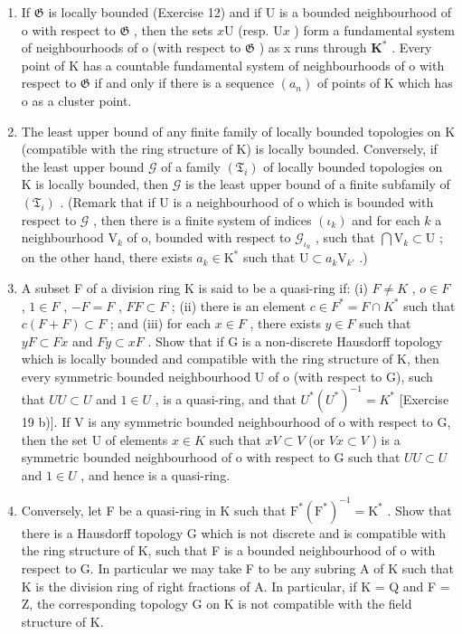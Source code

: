 \begin{enumerate}
\def\labelenumi{\alph{enumi})}
\setcounter{enumi}{1}
\item
  If \(\mathfrak{G}\) is locally bounded (Exercise 12) and if U is a bounded neighbourhood of o with respect to \(\mathfrak{G}\) , then the sets \(x\mathrm{U}\) (resp. \(\mathrm{U}x\) ) form a fundamental system of neighbourhoods of o (with respect to \(\mathfrak{G}\) ) as x runs through \(\mathbf{K}^*\) . Every point of K has a countable fundamental system of neighbourhoods of o with respect to \(\mathfrak{G}\) if and only if there is a sequence \((a_n)\) of points of K which has o as a cluster point.
\item
  The least upper bound of any finite family of locally bounded topologies on K (compatible with the ring structure of K) is locally bounded. Conversely, if the least upper bound \(\mathcal{G}\) of a family \((\mathfrak{T}_i)\) of locally bounded topologies on K is locally bounded, then \(\mathcal{G}\) is the least upper bound of a finite subfamily of \((\mathfrak{T}_i)\) . (Remark that if U is a neighbourhood of o which is bounded with respect to \(\mathcal{G}\) , then there is a finite system of indices \((\iota_k)\) and for each \(k\) a neighbourhood \(\mathrm{V}_k\) of o, bounded with respect to \(\mathcal{G}_{\iota_k}\) , such that \(\bigcap \mathrm{V}_k \subset \mathrm{U}\) ; on the other hand, there exists \(a_k \in \mathrm{K}^*\) such that \(\mathrm{U} \subset a_k \mathrm{V}_{k'}\) .)
\item
  A subset F of a division ring K is said to be a quasi-ring if: (i) \(F \neq K\) , \(o \in F\) , \(1 \in F\) , \(-F = F\) , \(FF \subset F\) ; (ii) there is an element \(c \in F^{*} = F \cap K^{*}\) such that \(c(F + F) \subset F\) ; and (iii) for each \(x \in F\) , there exists \(y \in F\) such that \(yF \subset Fx\) and \(Fy \subset xF\) . Show that if G is a non-discrete Hausdorff topology which is locally bounded and compatible with the ring structure of K, then every symmetric bounded neighbourhood U of o (with respect to G), such that \(UU \subset U\) and \(1 \in U\) , is a quasi-ring, and that \(U^{*}(U^{*})^{-1} = K^{*}\) {[}Exercise 19 b){]}. If V is any symmetric bounded neighbourhood of o with respect to G, then the set U of elements \(x \in K\) such that \(xV \subset V\) (or \(Vx \subset V\) ) is a symmetric bounded neighbourhood of o with respect to G such that \(UU \subset U\) and \(1 \in U\) , and hence is a quasi-ring.
\item
  Conversely, let F be a quasi-ring in K such that \(\mathrm{F}^{*}(\mathrm{F}^{*})^{-1} = \mathrm{K}^{*}\) . Show that there is a Hausdorff topology G which is not discrete and is compatible with the ring structure of K, such that F is a bounded neighbourhood of o with respect to G. In particular we may take F to be any subring A of K such that K is the division ring of right fractions of A. In particular, if K = Q and F = Z, the corresponding topology G on K is not compatible with the field structure of K.
\end{enumerate}

